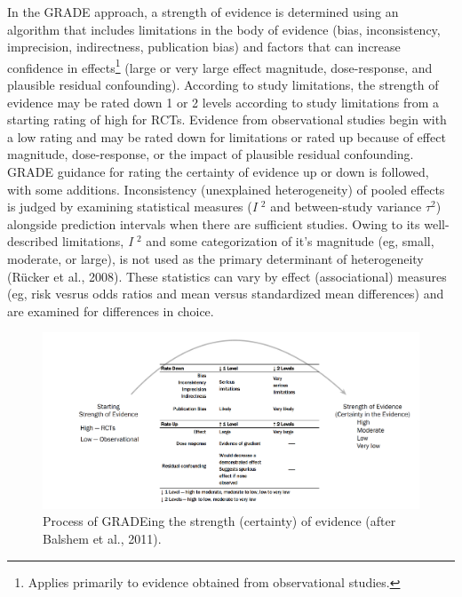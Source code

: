 \documentclass[
  letterpaper,
  DIV=11,
  numbers=noendperiod]{scrreprt}
\begin{document}
In the GRADE approach, a strength of evidence is determined using an
algorithm that includes limitations in the body of evidence (bias,
inconsistency, imprecision, indirectness, publication bias) and factors
that can increase confidence in effects\footnote{Applies primarily to
  evidence obtained from observational studies.} (large or very large
effect magnitude, dose-response, and plausible residual confounding).
According to study limitations, the strength of evidence may be rated
down 1 or 2 levels according to study limitations from a starting rating
of high for RCTs. Evidence from observational studies begin with a low
rating and may be rated down for limitations or rated up because of
effect magnitude, dose-response, or the impact of plausible residual
confounding. GRADE guidance for rating the certainty of evidence up or
down is followed, with some additions. Inconsistency (unexplained
heterogeneity) of pooled effects is judged by examining statistical
measures (\emph{I} \(^2\) and between-study variance \(\tau^2\))
alongside prediction intervals when there are sufficient studies. Owing
to its well-described limitations, \emph{I} \(^2\) and some
categorization of it's magnitude (eg, small, moderate, or large), is not
used as the primary determinant of heterogeneity (Rücker et al., 2008).
These statistics can vary by effect (associational) measures (eg, risk
vesrus odds ratios and mean versus standardized mean differences) and
are examined for differences in choice.

\begin{figure}

\caption{\label{fig-grading}Process of GRADEing the strength (certainty)
of evidence (after Balshem et al., 2011).}

{\centering \includegraphics{assets/UpDownGrading.png}

}

\end{figure}
\end{document}

